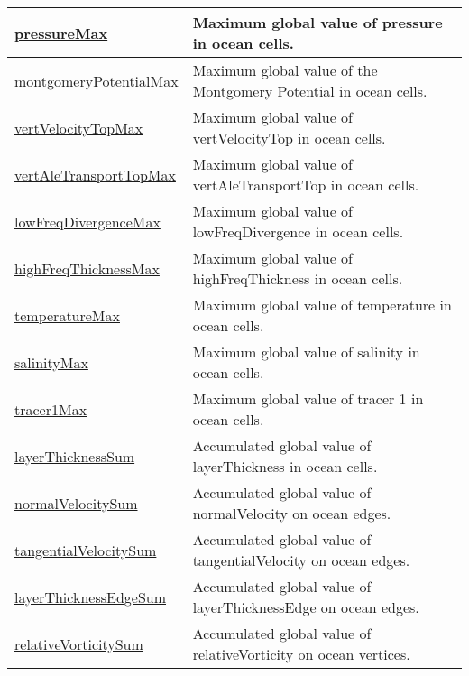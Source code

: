 {\begin{center}
\begin{longtable}{| p{2.0in} | p{4.0in} |}
	\hline
	\hyperref[subsec:var_sec_amGlobalStats_pressureMax]{pressureMax} & Maximum global value of pressure in ocean cells. \\
	\hline
	\hyperref[subsec:var_sec_amGlobalStats_montgomeryPotentialMax]{montgomeryPotentialMax} & Maximum global value of the Montgomery Potential in ocean cells. \\
	\hline
	\hyperref[subsec:var_sec_amGlobalStats_vertVelocityTopMax]{vertVelocityTopMax} & Maximum global value of vertVelocityTop in ocean cells. \\
	\hline
	\hyperref[subsec:var_sec_amGlobalStats_vertAleTransportTopMax]{vertAleTransportTopMax} & Maximum global value of vertAleTransportTop in ocean cells. \\
	\hline
	\hyperref[subsec:var_sec_amGlobalStats_lowFreqDivergenceMax]{lowFreqDivergenceMax} & Maximum global value of lowFreqDivergence in ocean cells. \\
	\hline
	\hyperref[subsec:var_sec_amGlobalStats_highFreqThicknessMax]{highFreqThicknessMax} & Maximum global value of highFreqThickness in ocean cells. \\
	\hline
	\hyperref[subsec:var_sec_amGlobalStats_temperatureMax]{temperatureMax} & Maximum global value of temperature in ocean cells. \\
	\hline
	\hyperref[subsec:var_sec_amGlobalStats_salinityMax]{salinityMax} & Maximum global value of salinity in ocean cells. \\
	\hline
	\hyperref[subsec:var_sec_amGlobalStats_tracer1Max]{tracer1Max} & Maximum global value of tracer 1 in ocean cells. \\
	\hline
	\hyperref[subsec:var_sec_amGlobalStats_layerThicknessSum]{layerThicknessSum} & Accumulated global value of layerThickness in ocean cells. \\
	\hline
	\hyperref[subsec:var_sec_amGlobalStats_normalVelocitySum]{normalVelocitySum} & Accumulated global value of normalVelocity on ocean edges. \\
	\hline
	\hyperref[subsec:var_sec_amGlobalStats_tangentialVelocitySum]{tangentialVelocitySum} & Accumulated global value of tangentialVelocity on ocean edges. \\
	\hline
	\hyperref[subsec:var_sec_amGlobalStats_layerThicknessEdgeSum]{layerThicknessEdgeSum} & Accumulated global value of layerThicknessEdge on ocean edges. \\
	\hline
	\hyperref[subsec:var_sec_amGlobalStats_relativeVorticitySum]{relativeVorticitySum} & Accumulated global value of relativeVorticity on ocean vertices. \\

\end{longtable}
\end{center}}
